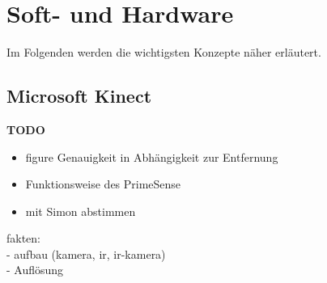\section{Soft- und Hardware}
\label{sec:softundhardware}

Im Folgenden werden die wichtigsten Konzepte näher erläutert.

\subsection{Microsoft Kinect}
\textbf{TODO}
\begin{itemize}
  \item figure Genauigkeit in Abhängigkeit zur Entfernung
  \item Funktionsweise des PrimeSense
  \item mit Simon abstimmen
\end{itemize}

\label{subsec:kinect}


{\color{red}fakten:}\\

{\color{red}- aufbau (kamera, ir, ir-kamera)}\\
{\color{red}- Auflösung}\\


